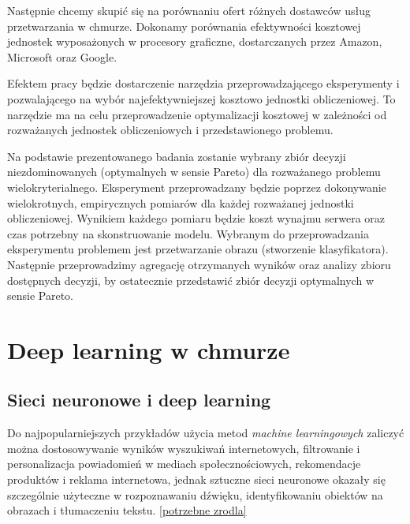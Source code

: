 \documentclass[12pt,a4paper,twoside]{article}
\begin{document}
Następnie chcemy skupić się na porównaniu ofert różnych dostawców usług przetwarzania w chmurze. Dokonamy porównania efektywności kosztowej jednostek wyposażonych w procesory graficzne, dostarczanych przez Amazon, Microsoft oraz Google.

Efektem pracy będzie dostarczenie narzędzia przeprowadzającego eksperymenty i pozwalającego na wybór najefektywniejszej kosztowo jednostki obliczeniowej. To narzędzie ma na
celu przeprowadzenie optymalizacji kosztowej w zależności od rozważanych jednostek obliczeniowych i przedstawionego problemu.

Na podstawie prezentowanego badania zostanie wybrany zbiór decyzji niezdominowanych (optymalnych w sensie Pareto) dla rozważanego problemu wielokryterialnego. Eksperyment przeprowadzany będzie poprzez dokonywanie wielokrotnych, empirycznych pomiarów dla każdej rozważanej jednostki obliczeniowej. Wynikiem każdego pomiaru będzie koszt wynajmu serwera oraz czas potrzebny na skonstruowanie modelu. Wybranym do przeprowadzania eksperymentu problemem jest przetwarzanie obrazu (stworzenie klasyfikatora). Następnie przeprowadzimy agregację otrzymanych wyników oraz analizy zbioru dostępnych decyzji, by ostatecznie przedstawić zbiór decyzji optymalnych w sensie Pareto.

\clearpage


\section{Deep learning w chmurze}
\subsection{Sieci neuronowe i deep learning}

Do najpopularniejszych przykładów użycia metod \textit{machine learningowych} zaliczyć można dostosowywanie wyników wyszukiwań internetowych, filtrowanie i personalizacja powiadomień w mediach społecznościowych, rekomendacje produktów i reklama internetowa, jednak sztuczne sieci neuronowe okazały się szczególnie użyteczne w rozpoznawaniu dźwięku, identyfikowaniu obiektów na obrazach i tłumaczeniu tekstu. \ref{potrzebne zrodla}
\end{document}
